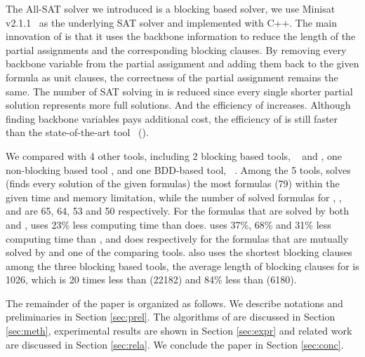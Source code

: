 The All-SAT solver \tool we introduced is a blocking based solver, we use Minisat v2.1.1~\cite{minisat} as the underlying SAT solver and implemented \tool with C++. The main innovation of \tool is that it uses the backbone information to reduce the length of the partial assignments and the corresponding blocking clauses. By removing every backbone variable from the partial assignment and adding them back to the given formula as unit clauses, the correctness of the partial assignment remains the same.
The number of SAT solving in \tool is reduced since every single shorter partial solution represents more full solutions. And the efficiency of \tool increases. Although finding backbone variables pays additional cost, the efficiency of \tool is still faster than the state-of-the-art tool~\cite{ctool} (\ctool).

We compared \tool with 4 other tools, including 2 blocking based tools, \ctool~\cite{ctool} and \bc, one non-blocking based tool , \nbc and one BDD-based tool, \bdd~\cite{ietool}. Among the 5 tools, \tool solves (finds every solution of the given formulas) the most formulas (79) within the given time and memory limitation, while the number of solved formulas for \ctool, \bc, \nbc and \bdd  are 65, 64, 53 and 50 respectively. 
For the formulas that are solved by both \tool and \ctool, \tool uses 23\% less computing time than \ctool does.
\tool uses 37\%, 68\% and 31\% less computing time than \bc, \nbc and \bdd does respectively for the formulas that are mutually solved by \tool and one of the comparing tools.
\tool also uses the shortest blocking clauses among the three blocking based tools, the average length of blocking clauses for \tool is 1026, which is 20 times less than \ctool (22182) and 84\% less than \bc (6180). 

The remainder of the paper is organized as follows. We describe notations and preliminaries in Section \ref{sec:prel}. The algorithms of \tool are discussed in Section \ref{sec:meth}, experimental results are shown in Section \ref{sec:expr} and related work are discussed in Section \ref{sec:rela}. We conclude the paper in Section \ref{sec:conc}.

